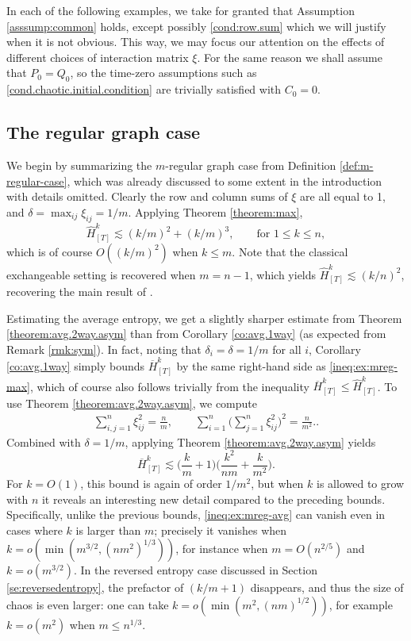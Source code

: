 \documentclass[11pt,reqno]{amsart}
\numberwithin{equation}{section}
\theoremstyle{definition}
\begin{document}
In each of the following examples, we take for granted that Assumption \ref{asssump:common} holds, except possibly \eqref{cond:row.sum} which we will justify when it is not obvious. This way, we may focus our attention on the effects of different choices of interaction matrix $\xi$. For the same reason we shall assume that $P_0 = Q_0$, so the time-zero assumptions such as \eqref{cond.chaotic.initial.condition} are trivially satisfied with $C_0=0$.

	
\subsection{The regular graph case}\label{ex:regular}
We begin by summarizing the $m$-regular graph case from Definition \ref{def:m-regular-case}, which was already discussed to some extent in the introduction with details omitted. Clearly the row and column sums of $\xi$ are all equal to 1, and $\delta=\max_{ij}\xi_{ij} =1/m$. Applying Theorem \ref{theorem:max},
\begin{equation}
\widehat{H}^{k}_{[T]} \lesssim (k/m)^2 + (k/m)^3  , \qquad \text{for } 1 \le k \le n, \label{ineq:ex:mreg-max}
\end{equation}
which is of course $O((k/m)^2)$ when $k \le m$.
Note that the classical exchangeable setting is recovered when $m=n-1$, which yields  $\widehat{H}^{k}_{[T]} \lesssim  (k/n)^2$, recovering the main result of \cite{lacker2022hierarchies}.

Estimating the average entropy, we get a slightly sharper estimate from Theorem \ref{theorem:avg.2way.asym} than from Corollary \ref{co:avg.1way} (as expected from Remark \ref{rmk:sym}). 
In fact, noting that $\delta_i=\delta=1/m$ for all $i$, Corollary \ref{co:avg.1way} simply bounds $\overline{H}^{k}_{[T]}$ by the same right-hand side as \eqref{ineq:ex:mreg-max}, which of course also follows trivially from the inequality  $\overline{H}^{k}_{[T]} \le \widehat{H}^{k}_{[T]} $.
To use Theorem \ref{theorem:avg.2way.asym}, we compute
\begin{align*}
 \sum_{i,j=1}^n\xi_{ij}^2 = \frac{n}{m}, \qquad 
\sum_{i=1}^n\bigg(\sum_{j=1}^n\xi_{ij}^2\bigg)^2 =  \frac{n}{m^2}..
\end{align*}
Combined with $\delta=1/m$, applying Theorem \ref{theorem:avg.2way.asym} yields
\begin{equation}
\overline{H}^{k}_{[T]} \lesssim \bigg( \frac{k}{m} + 1\bigg)\bigg(\frac{k^2}{nm} + \frac{k}{m^2}\bigg) . 
 \label{ineq:ex:mreg-avg}
\end{equation}
For $k=O(1)$, this bound is again of order $1/m^2$, but when $k$ is allowed to grow with $n$ it reveals an interesting new detail compared to the preceding bounds. Specifically, unlike the previous bounds, \eqref{ineq:ex:mreg-avg} can vanish even in cases where $k$ is larger than $m$; precisely it vanishes when $k = o(\min(m^{3/2},(nm^2)^{1/3}))$, for instance when $m = O(n^{2/5})$ and $k = o(m^{3/2})$. In the reversed entropy case discussed in Section \ref{se:reversedentropy}, the prefactor of $(k/m+1)$ disappears, and thus the size of chaos is even larger: one can take $k=o(\min(m^2,(nm)^{1/2}))$, for example $k=o(m^2)$ when $m \le n^{1/3}$.
\end{document}
